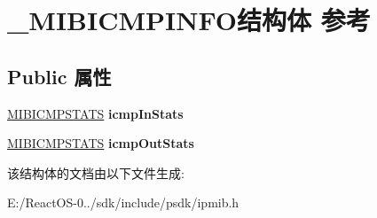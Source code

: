 \hypertarget{struct___m_i_b_i_c_m_p_i_n_f_o}{}\section{\+\_\+\+M\+I\+B\+I\+C\+M\+P\+I\+N\+F\+O结构体 参考}
\label{struct___m_i_b_i_c_m_p_i_n_f_o}
\subsection*{Public 属性}
\begin{DoxyCompactItemize}
\item 
\mbox{\label{struct___m_i_b_i_c_m_p_i_n_f_o_aaa8ddc09611c9497d5123f3c9dfbd207}} 
\hyperlink{struct___m_i_b_i_c_m_p_s_t_a_t_s}{M\+I\+B\+I\+C\+M\+P\+S\+T\+A\+TS} {\bfseries icmp\+In\+Stats}
\item 
\mbox{\label{struct___m_i_b_i_c_m_p_i_n_f_o_a4408101f6cf4b5736dd9b981b7377b56}} 
\hyperlink{struct___m_i_b_i_c_m_p_s_t_a_t_s}{M\+I\+B\+I\+C\+M\+P\+S\+T\+A\+TS} {\bfseries icmp\+Out\+Stats}
\end{DoxyCompactItemize}


该结构体的文档由以下文件生成\+:\begin{DoxyCompactItemize}
\item 
E\+:/\+React\+O\+S-\/0../sdk/include/psdk/ipmib.\+h\end{DoxyCompactItemize}
